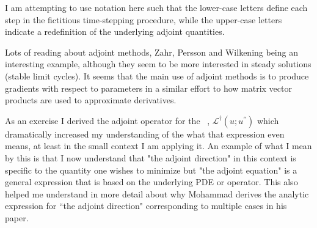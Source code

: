 \begin{description}
{\begin{description}
I am attempting to use notation here such that the lower-case letters define
each step in the fictitious time-stepping procedure, while the upper-case
letters indicate a redefinition of the underlying adjoint quantities.

\item[additional investigations]
Lots of reading about adjoint methods, Zahr, Persson and Wilkening
being an interesting example, although they seem to be more interested in
steady solutions (stable limit cycles). It seems that the main use of adjoint
methods is to produce gradients with respect to parameters in a similar effort
to how matrix vector products are used to approximate derivatives.

As an exercise I derived the adjoint operator for the \KSe\ ,
$\mathcal{L}^{\dagger}(u ; u^{''})$ which dramatically increased my
understanding of the what that expression even means, at least in the small
context I am applying it. An example of what I mean by this is that I now
understand that "the adjoint direction" in this context is specific to the
quantity one wishes to minimize but "the adjoint equation" is a general
expression that is based on the underlying PDE or operator. This also helped me
understand in more detail about why Mohammad derives the analytic expression
for ``the adjoint direction" corresponding to multiple cases in his
paper.

\end{description}
}


\end{description}
